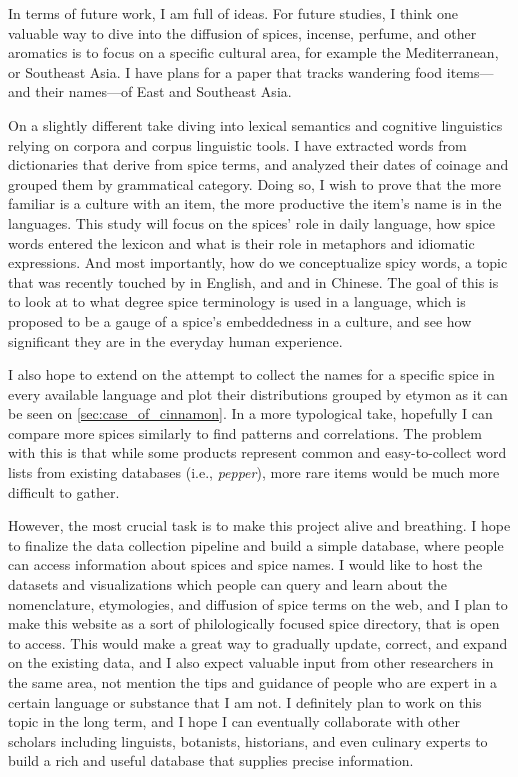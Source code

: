 In terms of future work, I am full of ideas. For future studies, I think one valuable way to dive into the diffusion of spices, incense, perfume, and other aromatics is to focus on a specific cultural area, for example the Mediterranean, or Southeast Asia. I have plans for a paper that tracks wandering food items---and their names---of East and Southeast Asia. 


On a slightly different take diving into lexical semantics and cognitive linguistics relying on corpora and corpus linguistic tools. I have extracted words from dictionaries that derive from spice terms, and analyzed their dates of coinage and grouped them by grammatical category. Doing so, I wish to prove that the more familiar is a culture with an item, the more productive the item's name is in the languages. This study will focus on the spices' role in daily language, how spice words entered the lexicon and what is their role in metaphors and idiomatic expressions. And most importantly, how do we conceptualize spicy words, a topic that was recently touched by \textcite{bagli_tastes_2021} in English, and \textcite{dong_corpus-based_2018} and \textcite{zhong_bodily_2021} in Chinese. The goal of this is to  look at to what degree spice terminology is used in a language, which is proposed to be a gauge of a spice's embeddedness in a culture, and see how significant they are in the everyday human experience.

I also hope to extend on the attempt to collect the names for a specific spice in every available language and plot their distributions grouped by etymon as it can be seen on \cref{sec:case_of_cinnamon}. In a more typological take, hopefully I can compare more spices similarly to find patterns and correlations. The problem with this is that while some products represent common and easy-to-collect word lists from existing databases (i.e., \textit{pepper}), more rare items would be much more difficult to gather. 

However, the most crucial task is to make this project alive and breathing. I hope to finalize the data collection pipeline and build a simple database, where people can access information about spices and spice names. I would like to host the datasets and visualizations which people can query and learn about the nomenclature, etymologies, and diffusion of spice terms on the web, and I plan to make this website as a sort of philologically focused spice directory, that is open to access. This would make a great way to gradually update, correct, and expand on the existing data, and I also expect valuable input from other researchers in the same area, not mention the tips and guidance of people who are expert in a certain language or substance that I am not. I definitely plan to work on this topic in the long term, and I hope I can eventually collaborate with other scholars including linguists, botanists, historians, and even culinary experts to build a rich and useful database that supplies precise information.